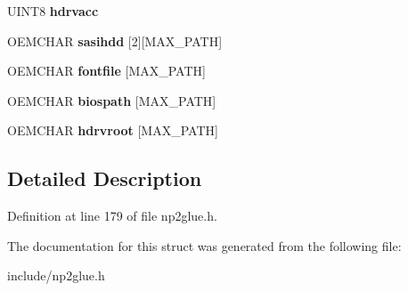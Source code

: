 \begin{DoxyCompactItemize}
\item 
\hypertarget{structNP2CFG_a3fcb7abdb9a79824af6d08d619939bfd}{U\-I\-N\-T8 {\bfseries hdrvacc}}\label{structNP2CFG_a3fcb7abdb9a79824af6d08d619939bfd}

\item 
\hypertarget{structNP2CFG_a10760e7864ee87a272f11d69b443bd9a}{O\-E\-M\-C\-H\-A\-R {\bfseries sasihdd} \mbox{[}2\mbox{]}\mbox{[}M\-A\-X\-\_\-\-P\-A\-T\-H\mbox{]}}\label{structNP2CFG_a10760e7864ee87a272f11d69b443bd9a}

\item 
\hypertarget{structNP2CFG_aad32a36f7c3efd58e91ac63364217251}{O\-E\-M\-C\-H\-A\-R {\bfseries fontfile} \mbox{[}M\-A\-X\-\_\-\-P\-A\-T\-H\mbox{]}}\label{structNP2CFG_aad32a36f7c3efd58e91ac63364217251}

\item 
\hypertarget{structNP2CFG_aa7824b99760945ec89ab24bd58a02f54}{O\-E\-M\-C\-H\-A\-R {\bfseries biospath} \mbox{[}M\-A\-X\-\_\-\-P\-A\-T\-H\mbox{]}}\label{structNP2CFG_aa7824b99760945ec89ab24bd58a02f54}

\item 
\hypertarget{structNP2CFG_a384ccba7ed9a3a5ac5834f2188762322}{O\-E\-M\-C\-H\-A\-R {\bfseries hdrvroot} \mbox{[}M\-A\-X\-\_\-\-P\-A\-T\-H\mbox{]}}\label{structNP2CFG_a384ccba7ed9a3a5ac5834f2188762322}

\end{DoxyCompactItemize}


\subsection{Detailed Description}


Definition at line 179 of file np2glue.\-h.



The documentation for this struct was generated from the following file\-:\begin{DoxyCompactItemize}
\item 
include/np2glue.\-h\end{DoxyCompactItemize}
